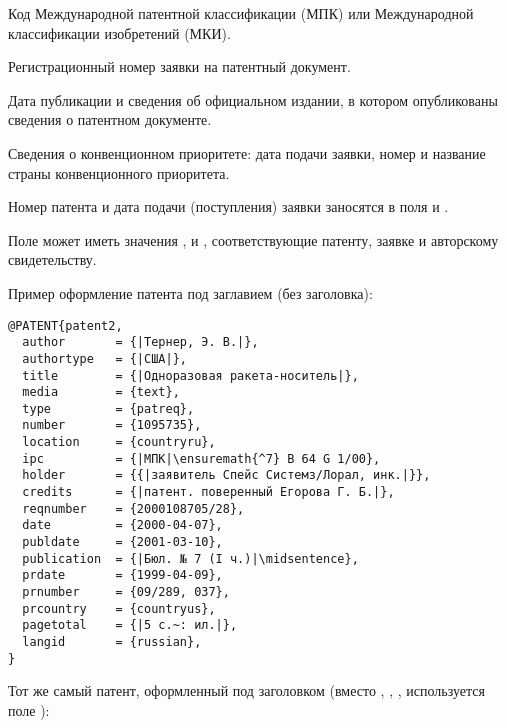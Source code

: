 \documentclass[10pt,a4paper,headings=small,numbers=enddot,english,russian]{ltxdockit}
\newcommand*{\noitemspace}{\vspace{-\itemsep}\vspace{-\parsep}\vspace{-.6ex}}
\begin{document}
\begin{fieldlist}


Код Международной патентной классификации (МПК) или Международной
классификации изобретений (МКИ).


Регистрационный номер заявки на патентный документ.

\noitemspace%

Дата публикации и сведения об официальном издании, в котором опубликованы сведения о
патентном документе.

\noitemspace%
\noitemspace%

Сведения о конвенционном приоритете: дата подачи заявки, номер и название
страны конвенционного приоритета.

\end{fieldlist}

Номер патента и дата подачи (поступления) заявки заносятся в поля  и
.

Поле  может иметь значения ,  и ,
соответствующие патенту, заявке и авторскому свидетельству.

Пример оформление патента под заглавием (без заголовка):

\begin{lstlisting}[style=bibtex,escapechar=|]
@PATENT{patent2,
  author       = {|Тернер, Э. В.|},
  authortype   = {|США|},
  title        = {|Одноразовая ракета-носитель|},
  media        = {text},
  type         = {patreq},
  number       = {1095735},
  location     = {countryru},
  ipc          = {|МПК|\ensuremath{^7} B 64 G 1/00},
  holder       = {{|заявитель Спейс Системз/Лорал, инк.|}},
  credits      = {|патент. поверенный Егорова Г. Б.|},
  reqnumber    = {2000108705/28},
  date         = {2000-04-07},
  publdate     = {2001-03-10},
  publication  = {|Бюл. № 7 (I ч.)|\midsentence},
  prdate       = {1999-04-09},
  prnumber     = {09/289, 037},
  prcountry    = {countryus},
  pagetotal    = {|5 с.~: ил.|},
  langid       = {russian},
}
\end{lstlisting}

Тот же самый патент, оформленный под заголовком (вместо
, , , 
используется поле ):
\end{document}
